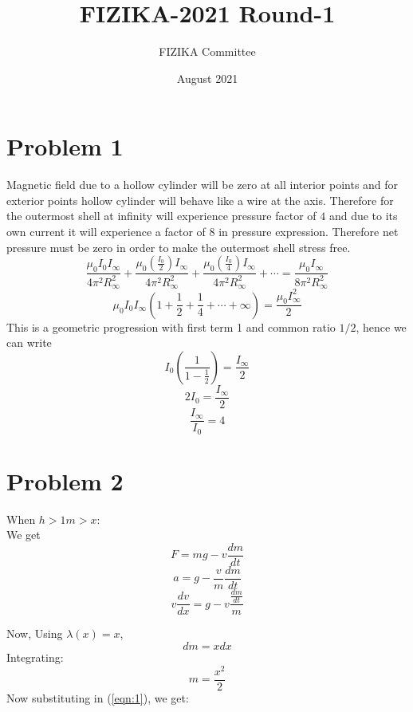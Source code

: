 \documentclass[11pt,a4paper]{scrartcl}
\title{FIZIKA-2021 Round-1}
\author{FIZIKA Committee}
\date{August 2021}
\begin{document}
\maketitle
 
\vspace{8mm}
\section{Problem 1}
\begin{solution}
Magnetic field due to a hollow cylinder will be zero at all interior points and for exterior points hollow cylinder will behave like a wire at the axis. Therefore for the outermost shell at infinity will experience pressure factor of $4$ and due to its own current it will experience a factor of $8$ in pressure expression. Therefore net pressure must be zero in order to make the outermost shell stress free.
$$\frac{\mu_{0} I_{0} I_{\infty}}{4\pi^2 R_{\infty}^2}+\frac{\mu_{0} \left(\frac{I_{0}}{2}\right) I_{\infty}}{4\pi^2 R_{\infty}^2}+\frac{\mu_{0} \left(\frac{I_{0}}{4}\right) I_{\infty}}{4\pi^2 R_{\infty}^2}+\cdots= \frac{\mu_{0} I_{\infty}}{8\pi^2 R_{\infty}^2}$$
$$\mu_{0} I_{0} I_{\infty} \left(1+\frac{1}{2}+\frac{1}{4}+\cdots+\infty\right)=\frac{\mu_{0} I_{\infty}^2}{2}$$
This is a geometric progression with first term 1 and common ratio $1/2$, hence we can write
$$I_{0} \left(\frac{1}{1-\frac{1}{2}}\right)=\frac{I_\infty}{2}$$
$$2I_0 = \frac{I_\infty}{2}$$
$$\boxed{\frac{I_\infty}{I_0}=4}$$
\end{solution}

\section{Problem 2}
\begin{solution}
When $h>1m>x$:\\
We get $$F= mg- v\frac{dm}{dt}$$
$$a= g- \frac{v}{m}\frac{dm}{dt}$$
\begin{equation}
\label{eqn:1}
v \frac{dv}{dx} = g- v\frac{\frac{dm}{dt}}{m}
\end{equation}

Now, Using $\lambda(x)=x$, $$dm = x dx$$
Integrating:
$$m = \frac{x^2}{2}$$
Now substituting in (\ref{eqn:1}), we get:
\end{solution}
\end{document}
